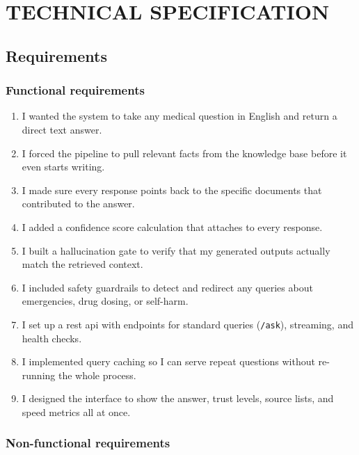 \chapter{\MakeUppercase{Technical Specification}}

\section{Requirements}

\subsection{Functional requirements}

\begin{enumerate}
    \item I wanted the system to take any medical question in English and return a direct text answer.
    \item I forced the pipeline to pull relevant facts from the knowledge base before it even starts writing.
    \item I made sure every response points back to the specific documents that contributed to the answer.
    \item I added a confidence score calculation that attaches to every response.
    \item I built a hallucination gate to verify that my generated outputs actually match the retrieved context.
    \item I included safety guardrails to detect and redirect any queries about emergencies, drug dosing, or self-harm.
    \item I set up a \ac{rest} \ac{api} with endpoints for standard queries (\texttt{/ask}), streaming, and health checks.
    \item I implemented query caching so I can serve repeat questions without re-running the whole process.
    \item I designed the interface to show the answer, trust levels, source lists, and speed metrics all at once.
\end{enumerate}

\subsection{Non-functional requirements}

